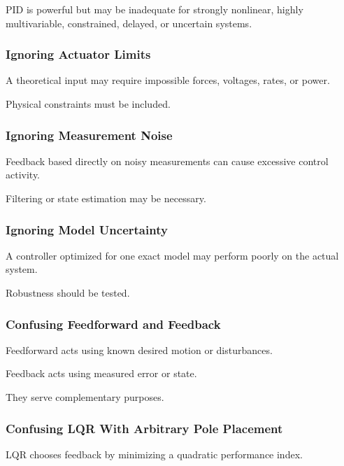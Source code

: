 PID is powerful but may be inadequate for strongly nonlinear, highly
multivariable, constrained, delayed, or uncertain systems.

\subsubsection{Ignoring Actuator Limits}

A theoretical input may require impossible forces, voltages, rates, or power.

Physical constraints must be included.

\subsubsection{Ignoring Measurement Noise}

Feedback based directly on noisy measurements can cause excessive control
activity.

Filtering or state estimation may be necessary.

\subsubsection{Ignoring Model Uncertainty}

A controller optimized for one exact model may perform poorly on the actual
system.

Robustness should be tested.

\subsubsection{Confusing Feedforward and Feedback}

Feedforward acts using known desired motion or disturbances.

Feedback acts using measured error or state.

They serve complementary purposes.

\subsubsection{Confusing LQR With Arbitrary Pole Placement}

LQR chooses feedback by minimizing a quadratic performance index.


